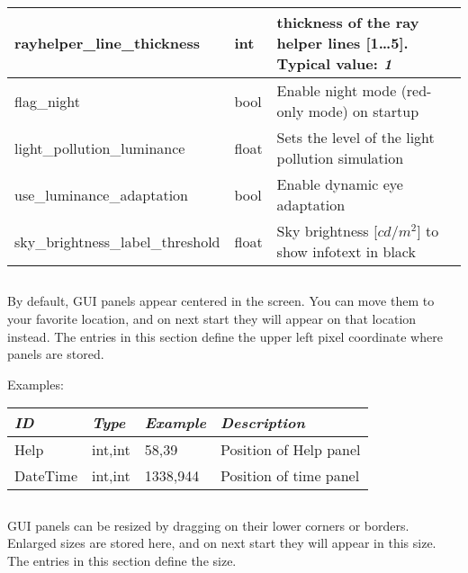 \begin{longtable}{l|l|p{77mm}}
rayhelper\_line\_thickness         & int   & thickness of the ray helper lines [1\ldots5]. Typical value: \emph{1}\\\midrule
flag\_night                        & bool  & Enable night mode (red-only mode) on startup\\\midrule
light\_pollution\_luminance        & float & Sets the level of the light pollution simulation\\\midrule %
use\_luminance\_adaptation         & bool  & Enable dynamic eye adaptation\\\midrule %
sky\_brightness\_label\_threshold  & float & Sky brightness [$cd/m^2$] to show infotext in black \\ %
\bottomrule
\end{longtable}



\subsection{}

By default, GUI panels appear centered in the screen. You can move them to your favorite location, 
and on next start they will appear on that location instead.
The entries in this section define the upper left pixel coordinate where panels are stored.

Examples:

\noindent%
\begin{tabularx}{\textwidth}{l|l|l|X}
\toprule
\emph{ID}     & \emph{Type} & \emph{Example}&\emph{Description}     \\\midrule
Help          & int,int     &  58,39        & Position of Help panel\\%
DateTime      & int,int     &  1338,944     & Position of time panel\\\bottomrule
\end{tabularx}


\subsection{}

GUI panels can be resized by dragging on their lower corners or borders.  
Enlarged sizes are stored here, and on next start they will appear in this size.
The entries in this section define the size.


